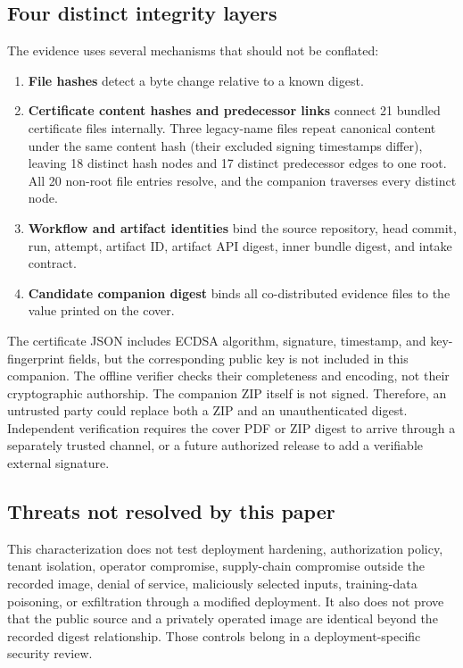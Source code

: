 \subsection{Four distinct integrity layers}

The evidence uses several mechanisms that should not be conflated:

\begin{enumerate}
  \item \textbf{File hashes} detect a byte change relative to a known digest.
  \item \textbf{Certificate content hashes and predecessor links} connect 21 bundled certificate
        files internally. Three legacy-name files repeat canonical content under the same content
        hash (their excluded signing timestamps differ), leaving 18 distinct hash nodes and 17
        distinct predecessor edges to one root. All 20 non-root file entries resolve, and the
        companion traverses every distinct node.
  \item \textbf{Workflow and artifact identities} bind the source repository, head commit, run,
        attempt, artifact ID, artifact API digest, inner bundle digest, and intake contract.
  \item \textbf{Candidate companion digest} binds all co-distributed evidence files to the value
        printed on the cover.
\end{enumerate}

The certificate JSON includes ECDSA algorithm, signature, timestamp, and key-fingerprint fields,
but the corresponding public key is not included in this companion. The offline verifier checks
their completeness and encoding, not their cryptographic authorship. The companion ZIP itself is
not signed. Therefore, an untrusted party could replace both a ZIP and an unauthenticated digest.
Independent verification requires the cover PDF or ZIP digest to arrive through a separately
trusted channel, or a future authorized release to add a verifiable external signature.

\subsection{Threats not resolved by this paper}

This characterization does not test deployment hardening, authorization policy, tenant isolation,
operator compromise, supply-chain compromise outside the recorded image, denial of service,
maliciously selected inputs, training-data poisoning, or exfiltration through a modified deployment.
It also does not prove that the public source and a privately operated image are identical beyond
the recorded digest relationship. Those controls belong in a deployment-specific security review.
